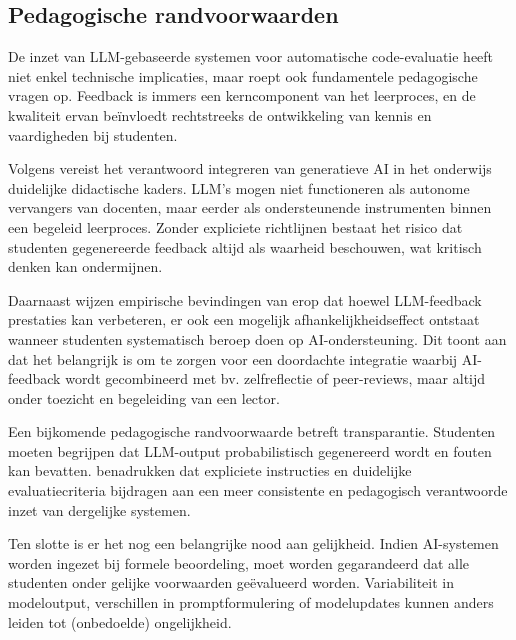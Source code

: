\subsection{Pedagogische randvoorwaarden}

De inzet van LLM-gebaseerde systemen voor automatische code-evaluatie heeft niet enkel technische implicaties, maar roept ook fundamentele pedagogische vragen op. Feedback is immers een kerncomponent van het leerproces, en de kwaliteit ervan beïnvloedt rechtstreeks de ontwikkeling van kennis en vaardigheden bij studenten.

\vspace{1em}

Volgens \textcite{Kasneci2023} vereist het verantwoord integreren van generatieve AI in het onderwijs duidelijke didactische kaders. LLM’s mogen niet functioneren als autonome vervangers van docenten, maar eerder als ondersteunende instrumenten binnen een begeleid leerproces. Zonder expliciete richtlijnen bestaat het risico dat studenten gegenereerde feedback altijd als waarheid beschouwen, wat kritisch denken kan ondermijnen.

\vspace{1em}

Daarnaast wijzen empirische bevindingen van \textcite{Zhou2025} erop dat hoewel LLM-feedback prestaties kan verbeteren, er ook een mogelijk afhankelijkheidseffect ontstaat wanneer studenten systematisch beroep doen op AI-ondersteuning. Dit toont aan dat het belangrijk is om te zorgen voor een doordachte integratie waarbij AI-feedback wordt gecombineerd met bv. zelfreflectie of peer-reviews, maar altijd onder toezicht en begeleiding van een lector.

\vspace{1em}

Een bijkomende pedagogische randvoorwaarde betreft transparantie. Studenten moeten begrijpen dat LLM-output probabilistisch gegenereerd wordt en fouten kan bevatten. \textcite{Koutcheme2025} benadrukken dat expliciete instructies en duidelijke evaluatiecriteria bijdragen aan een meer consistente en pedagogisch verantwoorde inzet van dergelijke systemen.

\vspace{1em}

Ten slotte is er het nog een belangrijke nood aan gelijkheid. Indien AI-systemen worden ingezet bij formele beoordeling, moet worden gegarandeerd dat alle studenten onder gelijke voorwaarden geëvalueerd worden. Variabiliteit in modeloutput, verschillen in promptformulering of modelupdates kunnen anders leiden tot (onbedoelde) ongelijkheid.

